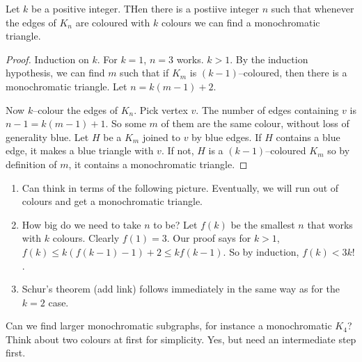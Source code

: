 \documentclass{article}
\begin{document}
\begin{nprop}
    Let $k$ be a positive integer. THen there is a postiive integer $n$ such that whenever the edges of $K_n$ are coloured with $k$ colours we can find a monochromatic triangle.
\end{nprop}

\begin{proof}
    Induction on $k$. For $k=1$, $n=3$ works.
    $k>1$. By the induction hypothesis, we can find $m$ such that if $K_m$ is $(k-1)$--coloured, then there is a monochromatic triangle.  Let $n = k(m-1) + 2$.

    Now $k$--colour the edges of $K_n$.  Pick vertex $v$.  The number of edges containing $v$ is $n-1 = k(m-1)+1$.  So some $m$ of them are the same colour, without loss of generality blue.  Let $H$ be a $K_m$ joined to $v$ by blue edges. If $H$ contains a blue edge, it makes a blue triangle with $v$. If not, $H$ is a $(k-1)$--coloured $K_m$ so by definition of $m$, it contains a monochromatic triangle.
\end{proof}

\begin{remark}
    \leavevmode
    \begin{enumerate}
        \item Can think in terms of the following picture. Eventually, we will run out of colours and get a monochromatic triangle.
        \item How big do we need to take $n$ to be?  Let $f(k)$ be the smallest $n$ that works with $k$ colours. Clearly $f(1) = 3$. Our proof says for $k>1$, $f(k) \leq k \left(f(k-1)-1\right) + 2 \leq k f(k-1)$.  So by induction, $f(k) < 3 k!$.
        \item Schur's theorem (add link) follows immediately in the same way as for the $k=2$ case.
    \end{enumerate}
\end{remark}

Can we find larger monochromatic subgraphs, for instance a monochromatic $K_4$?  Think about two colours at first for simplicity.  Yes, but need an intermediate step first.
\end{document}
